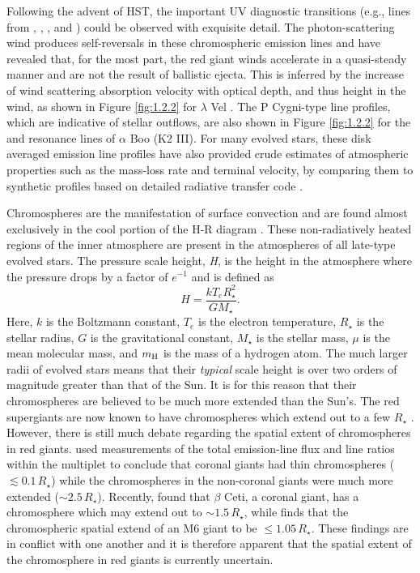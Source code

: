 Following the advent of HST, the important UV diagnostic transitions (e.g., lines from , , , and ) could be observed with exquisite detail. The photon-scattering wind produces self-reversals in these chromospheric emission lines and have revealed that, for the most part, the red giant winds accelerate in a quasi-steady manner and are not the result of ballistic ejecta. This is inferred by the increase of wind scattering absorption velocity with optical depth, and thus height in the wind, as shown in Figure \ref{fig:1.2.2} for $\lambda$ Vel \citep{carpenter_1999}. The P Cygni-type line profiles, which are indicative of stellar outflows, are also shown in Figure \ref{fig:1.2.2} for the  and  resonance lines of $\alpha$ Boo (K2 III). For many evolved stars, these disk averaged emission line profiles have also provided crude estimates of atmospheric properties such as the mass-loss rate and terminal velocity, by comparing them to synthetic profiles based on detailed radiative transfer code \citep[e.g.,][]{robinson_1998}.

Chromospheres are the manifestation of surface convection and are found almost exclusively in the cool portion of the H-R diagram \citep{ayres_2010b}. These non-radiatively  heated regions of the inner atmosphere are present in the atmospheres of all late-type evolved stars. The pressure scale height, \textit{H}, is the height in the atmosphere where the pressure drops by a factor of $e^{-1}$ and is defined as
\begin{equation}
H=\frac{kT_eR_{\star}^2}{GM_{\star}}.
\end{equation}
Here, $k$ is the Boltzmann constant, $T_{e}$ is the electron temperature, $R_{\star}$ is the stellar radius, $G$ is the gravitational constant, $M_{\star}$ is the stellar mass, $\mu$ is the mean molecular mass, and $m_{\rm{H}}$ is the mass of a hydrogen atom. The much larger radii of evolved stars means that their \textit{typical} scale height is over two orders of magnitude greater than that of the Sun. It is for this reason that their chromospheres are believed to be much more extended than the Sun's. The red supergiants are now known to have chromospheres which extend out to a few $R_{\star}$ \citep{lim_1998, harper_2001}. However, there is still much debate regarding the spatial extent of chromospheres in red giants. \cite{carpenter_1985} used measurements of the total emission-line flux and line ratios within the  multiplet to conclude that coronal giants had thin chromospheres ($\lesssim 0.1\,R_{\star}$) while the chromospheres in the non-coronal giants were much more extended ($\sim 2.5\,R_{\star}$). Recently, \cite{berio_2011} found that $\beta$ Ceti, a coronal giant, has a chromosphere which may extend out to $\sim 1.5\,R_{\star}$, while \cite{luttermoser_1994} finds that the chromospheric spatial extend of an M6 giant to be $\le 1.05\,R_{\star}$. These findings are in conflict with one another and it is therefore apparent that the spatial extent of the chromosphere in red giants is currently uncertain.


